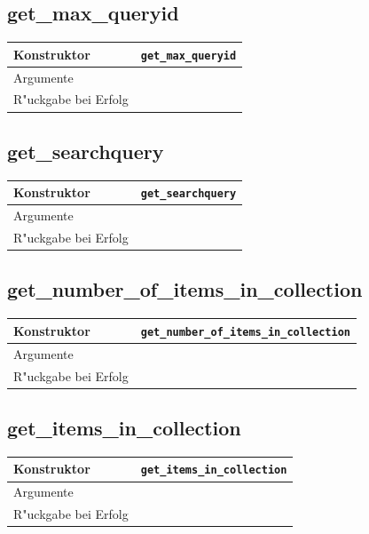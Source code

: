 \documentclass[11pt, twoside, a4paper, BCOR8mm, DIV12, bibtotoc,idxtotoc]{scrbook}
\begin{document}
\subsection{get\_max\_queryid}
\begin{shadowenv}
\begin{tabular}{lp{10cm}}
  Konstruktor & \texttt{get\_max\_queryid}\\
  \hline
  Argumente     & \\
  R"uckgabe bei Erfolg & \\
\end{tabular}
\end{shadowenv}

\subsection{get\_searchquery}
\begin{shadowenv}
\begin{tabular}{lp{10cm}}
  Konstruktor & \texttt{get\_searchquery}\\
  \hline
  Argumente     & \\
  R"uckgabe bei Erfolg & \\
\end{tabular}
\end{shadowenv}

\subsection{get\_number\_of\_items\_in\_collection}
\begin{shadowenv}
\begin{tabular}{lp{10cm}}
  Konstruktor & \texttt{get\_number\_of\_items\_in\_collection}\\
  \hline
  Argumente     & \\
  R"uckgabe bei Erfolg & \\
\end{tabular}
\end{shadowenv}

\subsection{get\_items\_in\_collection}
\begin{shadowenv}
\begin{tabular}{lp{10cm}}
  Konstruktor & \texttt{get\_items\_in\_collection}\\
  \hline
  Argumente     & \\
  R"uckgabe bei Erfolg & \\
\end{tabular}
\end{shadowenv}
\end{document}
